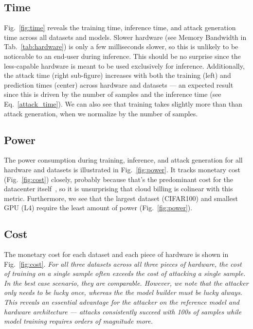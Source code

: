 \documentclass[conference]{IEEEtran}
\newcommand{\cm}[1]{\textit{{\color{blue}#1}}}
\begin{document}
\subsection{Time}
Fig.~\ref{fig:time} reveals the training time, inference time, and attack generation time across all datasets and models. Slower hardware (see Memory Bandwidth in Tab.~\ref{tab:hardware}) is only a few milliseconds slower, so this is unlikely to be noticeable to an end-user during inference. This should be no surprise since the less-capable hardware is meant to be used exclusively for inference. Additionally, the attack time (right sub-figure) increases with both the training (left) and prediction times (center) across hardware and datasets --- an expected result since this is driven by the number of samples and the inference time (see Eq.~\ref{attack_time}). We can also see that training takes slightly more than than attack generation, when we normalize by the number of samples.



\subsection{Power}
The power consumption during training, inference, and attack generation for all hardware and datasets is illustrated in Fig.~\ref{fig:power}. It tracks monetary cost (Fig.~\ref{fig:cost}) closely, probably because that's the predominant cost for the datacenter itself~\cite{dayarathna2015data}, so it is unsurprising that cloud billing is colinear with this metric. Furthermore, we see that the largest dataset (CIFAR100) and smallest GPU (L4) require the least amount of power (Fig.~\ref{fig:power}). 


\subsection{Cost}
\label{res:cost}
The monetary cost for each dataset and each piece of hardware is shown in Fig.~\ref{fig:cost}. \cm{For all three datasets across all three pieces of hardware, the cost of training on a single sample often exceeds the cost of attacking a single sample. In the best case scenario, they are comparable. However, we note that the attacker only needs to be lucky once, whereas the the model builder must be lucky always. This reveals an essential advantage for the attacker on the reference model and hardware architecture --- attacks consistently succeed with 100s of samples while model training requires orders of magnitude more.}
\end{document}
